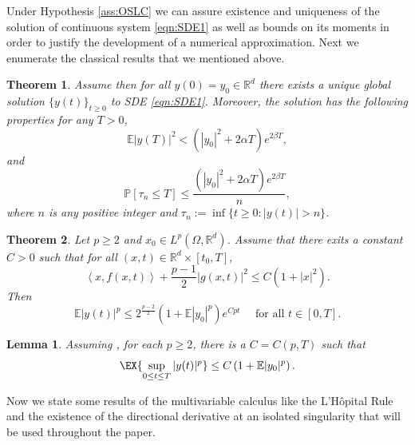 \documentclass[sort&compress, preprint]{elsarticle}
\theoremstyle{definition}
\theoremstyle{plain}%
\newtheorem{thm}{Theorem}[section]
\newtheorem{lem}{Lemma}[section]
\theoremstyle{remark}
\newcommand{\ms}[1]{\mathbb{E}\left|#1\right|^2}
\newcommand{\mep}[1]{\mathbb{E}|#1|^p}
\newcommand{\m}[1]{\mathbb{E}#1}
\newcommand{\Prob}[1]{\mathbb{P}\left[#1\right]}
\newcommand{\innerprod}[2]{\left\langle#1, #2\right\rangle}
\begin{document}
Under Hypothesis \ref{ass:OSLC} we can assure  existence and uniqueness 
of the solution of continuous system \eqref{eqn:SDE1}  as well as bounds on its moments
 in order to justify the development of a numerical approximation. Next we enumerate the classical 
 results that we mentioned above.
%
\begin{thm}
	Assume   then for all $y(0)=y_0\in \mathbb{R}^d$   there exists a 
	unique global solution $\{y(t)\}_{t\geq 0}$ to SDE \eqref{eqn:SDE1}. Moreover, the solution has the 
	following properties for any $T>0$,
	\begin{equation*}
		\ms{y(T)}< 
		\left(
			|y_0|^2 +2\alpha T 
		\right)e^{2\beta T},
	\end{equation*}
	and
	\begin{equation*}
	\Prob{\tau_n\leq T}
	\leq \frac{
		\left(
		|y_0|^2 +2\alpha T 
		\right)
		e^{2\beta T}
	}{n},
	\end{equation*}
	where $n$ is any positive integer and 
	$\tau_n := \inf \{ t\geq 0 : |y(t)|>n\}$.
\end{thm}
%
\begin{thm}
	\label{thm:MaoCoercive}
	Let $p\geq 2$ and $x_0\in L^p(\Omega, \mathbb{R}^d)$. Assume that there exits a constant $C>0$
	such that for all $(x,t)\in \mathbb{R}^d\times [t_0,T]$,
	\begin{equation*}
	\innerprod{x}{f(x,t)}+\frac{p-1}{2}|g(x,t)|^2 \leq C(1+|x|^2).
	\end{equation*}
	Then
	\begin{equation*}
	\m|y(t)|^p
	\leq
	2^{\frac{p-2}{2}}
	\left(
	1 + \m|y_0|^p
	\right)e^{Cpt} \quad \text{ for all } t\in[0,T].
	\end{equation*}
\end{thm}
%
\begin{lem}
	\label{lem:MomentBound}
	Assuming , for each $p\geq 2$, there is a $C=C(p,T)$ such that
	\begin{equation*}
	\EX{\sup_{0\leq t \leq T}|y(t)|^p}\leq C \left(1+\mep{y_0}\right).
	\end{equation*}
\end{lem}

Now we  state some  results of the multivariable calculus  like  
the L'H\^{o}pital Rule and the existence  of the directional derivative 
at an isolated singularity that will be used  throughout the paper.
\end{document}
